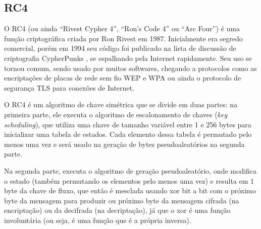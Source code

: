 
\subsection*{RC4}

O RC4 (ou ainda ``Rivest Cypher 4'', ``Ron's Code 4'' ou ``Arc Four'') é uma função
criptográfica criada por Ron Rivest em 1987. Inicialmente era segredo comercial, porém
em 1994 seu código foi publicado na lista de discussão de criptografia CypherPunks
\cite{site:rc4-code}, se espalhando pela Internet rapidamente. Seu uso se tornou comum,
sendo usado por muitos softwares, chegando a protocolos como as encriptações de placas
de rede sem fio WEP e WPA ou ainda o protocolo de segurança TLS para conexões de
Internet.

O RC4 é um algoritmo de chave simétrica que se divide em duas partes: na primeira
parte, ele executa o algoritmo de escalonamento de chaves (\emph{key scheduling}),
que utiliza uma chave de tamanho variável entre 1 e 256 bytes para inicializar uma
tabela de estados. Cada elemento dessa tabela é permutado pelo menos uma vez e será
usado na geração de bytes pseudoaleatórios na segunda parte.

Na segunda parte, executa o algoritmo de geração pseudoaleatório, onde modifica o estado
(também permutando os elementos pelo menos uma vez) e resulta em 1 byte da chave de
fluxo, que então é mesclada usando \gls{xor} bit a bit com o próximo byte da mensagem
para produzir ou próximo byte da mensagem cifrada (na encriptação) ou da decifrada (na
decriptação), já que o \gls*{xor} é uma função involuntária (ou seja, é uma função que
é a própria inversa).


